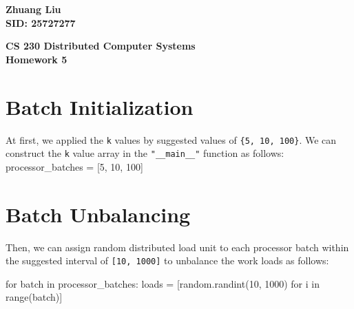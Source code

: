 \documentclass{article}%
\newenvironment{code}%
   {\snugshade\verbatim}%
   {\endverbatim\endsnugshade}
\begin{document}
\begin{flushright}
\begin{LARGE}

\textbf{Zhuang Liu \\
SID: 25727277}
\end{LARGE}
\end{flushright}

\begin{center}
\begin{huge}
\textbf{CS 230 Distributed Computer Systems \\
Homework 5} \\
\end{huge}
\end{center}

\section{Batch Initialization}
\begin{Large}
At first, we applied the \texttt{k} values by suggested values of \texttt{\{5, 10, 100\}}. We can construct the \texttt{k} value array in the \texttt{"\_\_main\_\_"} function as follows:
\begin{code}
    processor_batches = [5, 10, 100]
\end{code}
\end{Large}
\section{Batch Unbalancing}
\begin{Large}
Then, we can assign random distributed load unit to each processor batch within the suggested interval of \texttt{[10, 1000]} to unbalance the work loads as follows:

\begin{code}
    for batch in processor_batches:
        loads = [random.randint(10, 1000) for i in range(batch)]
\end{code}

\end{Large}
\end{document}
